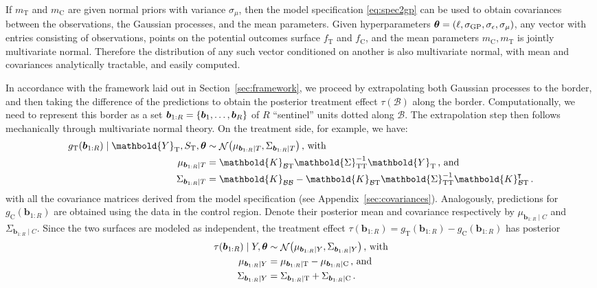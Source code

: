 \documentclass[letter]{article}
\DeclarePairedDelimiter{\parenthesis}{\lparen}{\rparen}
\DeclarePairedDelimiter{\curlybracket}{\lbrace}{\rbrace}
\newcommand{\del}[1]{\parenthesis*{#1}}
\newcommand{\cbr}[1]{\curlybracket*{#1}}
\DeclareMathOperator{\normal}{\mathcal{N}}
\newcommand*{\trans}{^{\mkern-1.5mu\intercal}}
\newcommand{\treat}{\mathrm{T}}
\newcommand{\ctrol}{\mathrm{C}}
\newcommand{\sigmaf}{\sigma_{\mathrm{GP}}}
\newcommand{\sigman}{\sigma_{\epsilon}}
\newcommand{\sigmamu}{\sigma_{\mu}}
\newcommand{\Yvec}{\mathbold{Y}}
\newcommand{\yt}{\Yvec_{\treat}}
\newcommand{\border}{\mathcal{B}}
\newcommand{\sentinel}{\bm{b}}
\newcommand{\numsent}{R}
\newcommand{\sentinels}{\sentinel_{1:\numsent}}
\newcommand{\sentinelset}{\cbr{\sentinel_1,\ldots,\sentinel_\numsent}}
\newcommand{\eqlabel}[1]{\label{#1}}
\newcommand{\hyperparam}{\bm{\theta}}
\newcommand{\Kmat}{\mathbold{K}}
\newcommand{\SigmaMat}{\mathbold{\Sigma}}
\newcommand{\KBB}{\Kmat_{\border \border}}
\newcommand{\KBT}{\Kmat_{\border \treat}}
\newcommand{\STT}{\SigmaMat_{\treat \treat}}
\begin{document}
If \(m_\treat\) and \(m_\ctrol\) are given normal priors with variance \(\sigmamu\), then the model specification \eqref{eq:spec2gp} can be used to obtain covariances between the observations, the Gaussian processes, and the mean parameters.
Given hyperparameters \(\hyperparam = \del{\ell,\sigmaf, \sigman, \sigmamu}\), any vector with entries consisting of observations, points on the potential outcomes surface \(f_{\treat}\) and \(f_{\ctrol}\), and the mean parameters \(m_{\ctrol}, m_{\treat}\) is jointly multivariate normal. Therefore the distribution of any such vector conditioned on another is also multivariate normal, with mean and covariances analytically tractable, and easily computed.
    


    	In accordance with the framework laid out in Section~\ref{sec:framework}, we proceed by extrapolating both Gaussian processes to the border,
and then taking the difference of the predictions to obtain the posterior treatment effect \(\tau(\border)\) along the border.
Computationally, we need to represent this border as a set \(\sentinels=\sentinelset\) of \(\numsent\) ``sentinel'' units dotted along \(\border\).
The extrapolation step then follows mechanically through multivariate normal theory.
On the treatment side, for example, we have:
\begin{equation}\begin{split}
    g_\treat{}(\sentinels) \mid \yt{}, S_\treat{}, \hyperparam &\sim \normal\del{\mu_{\sentinels \mid T}, \Sigma_{\sentinels \mid T}} \,\text{, with} \\
    \mu_{\sentinels \mid T} &=
            \KBT
            \STT^{-1} 
            \yt{} 
            \,\text{, and} \\
    \Sigma_{\sentinels \mid T} &=
            \KBB - \KBT \STT^{-1} \KBT\trans \,.
\end{split}
 \label{eq:postvar2gp_t_or_c}
\end{equation}
with all the covariance matrices derived from the model specification (see Appendix~\ref{sec:covariances}).
Analogously, predictions for \(g_\ctrol{}(\sentinels)\) are obtained using the data in the control region.
Denote their posterior mean and covariance respectively by \(\mu_{\sentinels \mid C}\) and \(\Sigma_{\sentinels \mid C}\).
Since the two surfaces are modeled as independent, the treatment effect \(\tau(\sentinels)=g_\treat{}(\sentinels)-g_\ctrol{}(\sentinels)\) has posterior
\begin{equation}
\begin{split}
    \tau(\sentinels) \mid Y, \hyperparam &\sim \normal\del{\mu_{\sentinels \mid Y}, \Sigma_{\sentinels \mid Y}} \,\text{, with}\\
    \mu_{\sentinels \mid Y} &= \mu_{\sentinels \mid \treat} - \mu_{\sentinels \mid \ctrol} \,\text{, and} \\
    \Sigma_{\sentinels \mid Y} &= \Sigma_{\sentinels \mid \treat} + \Sigma_{\sentinels \mid \ctrol} \,.
\end{split}
\eqlabel{eq:postvar2gp}
\end{equation}
\end{document}
